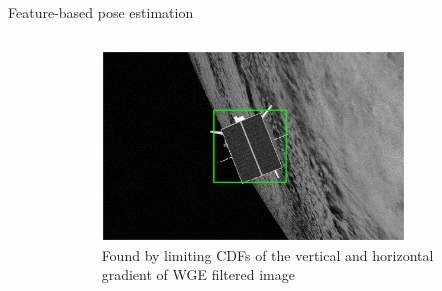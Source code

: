 \documentclass[10pt]{beamer}
\begin{document}
\begin{frame}{Feature-based pose estimation}
\begin{columns}[T,onlytextwidth]
\begin{column}{0.5\textwidth}
\begin{figure}
      \end{figure}
    \end{column}
    \begin{column}{0.5\textwidth}
      \vspace{0.6cm}
      \begin{figure}
        \captionsetup[subfigure]{labelformat=empty}
        \includegraphics[width=0.82\textwidth]{gfx/FeatureDetection/ROI.eps}\\
        {\footnotesize Found by limiting CDFs of the vertical and horizontal gradient of WGE filtered image}
      \end{figure}
    \end{column}
  \end{columns}

\end{frame}
\end{document}

